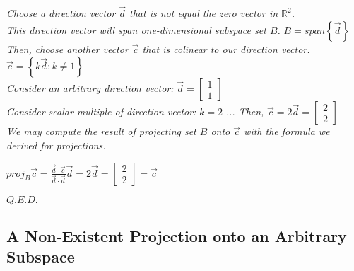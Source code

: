 \documentclass{article}
\newcommand{\vectorproj}[2][]{\textit{proj}_{{#1}}{#2}}
\begin{document}
{\begin{center}
	\textit{Choose a direction vector $\vec{d}$ that is not equal the zero vector in $\mathbb{R}^2$.} \\
	\textit{This direction vector will span one-dimensional subspace set $B$.} $B = span\left\lbrace \vec{d} \right\rbrace $ \\
	\textit{Then, choose another vector $\vec{c}$ that is colinear to our direction vector.}
	$ \vec{c} = \left\lbrace k\vec{d}: k \neq 1\right\rbrace$ \\
	\textit{Consider an arbitrary direction vector: }
	$\vec{d} = \begin{bmatrix} 1 \\ 1 \end{bmatrix}$ \\
	\textit{Consider scalar multiple of direction vector:}
	$k = 2$ 
	\textit{... Then,} $\vec{c} = 2\vec{d} = \begin{bmatrix} 2 \\ 2 \end{bmatrix}$ \\
	
	\textit{We may compute the result of projecting set $B$ onto $\vec{c}$ with the formula we derived for projections.}
	

		$\vectorproj[B]{\vec{c}} =\frac{\vec{d} \cdot \vec{c}}{\vec{d} \cdot \vec{d}} \vec{d} = 2\vec{d}  = \begin{bmatrix} 2 \\ 2 \end{bmatrix} = \vec{c}$

		$Q.E.D.$
\end{center}
\subsection{A Non-Existent Projection onto an Arbitrary Subspace}

}
\end{document}

